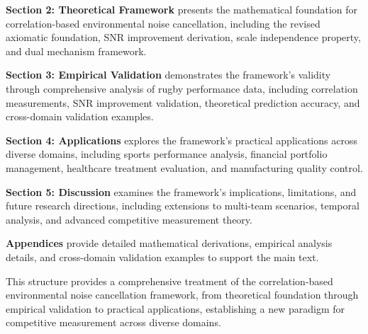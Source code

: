 \textbf{Section 2: Theoretical Framework} presents the mathematical foundation for correlation-based environmental noise cancellation, including the revised axiomatic foundation, SNR improvement derivation, scale independence property, and dual mechanism framework.

\textbf{Section 3: Empirical Validation} demonstrates the framework's validity through comprehensive analysis of rugby performance data, including correlation measurements, SNR improvement validation, theoretical prediction accuracy, and cross-domain validation examples.

\textbf{Section 4: Applications} explores the framework's practical applications across diverse domains, including sports performance analysis, financial portfolio management, healthcare treatment evaluation, and manufacturing quality control.

\textbf{Section 5: Discussion} examines the framework's implications, limitations, and future research directions, including extensions to multi-team scenarios, temporal analysis, and advanced competitive measurement theory.

\textbf{Appendices} provide detailed mathematical derivations, empirical analysis details, and cross-domain validation examples to support the main text.

This structure provides a comprehensive treatment of the correlation-based environmental noise cancellation framework, from theoretical foundation through empirical validation to practical applications, establishing a new paradigm for competitive measurement across diverse domains.
